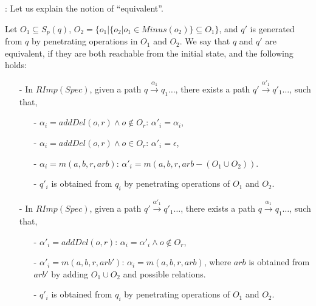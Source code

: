 : Let us explain the notion of ``equivalent''.

Let $O_1 \subseteq S_p(q)$, $O_2 = \{ o_1 \vert  \{ o_2 \vert o_1 \in Minus(o_2) \} \subseteq O_1 \}$, and $q'$ is generated from $q$ by penetrating operations in $O_1$ and $O_2$. We say that $q$ and $q'$ are equivalent, if they are both reachable from the initial state, and the following holds:

\begin{itemize}
\setlength{\itemsep}{0.5pt}
\item[-] In $RImp(Spec)$, given a path $q {\xrightarrow{\alpha_1}} q_1 \ldots$, there exists a path $q' {\xrightarrow{\alpha'_1}} q'_1 \ldots$, such that,

    \begin{itemize}
    \setlength{\itemsep}{0.5pt}
    \item[-] $\alpha_i = addDel(o,r) \wedge o \notin O_r$: $\alpha'_i = \alpha_i$,

    \item[-] $\alpha_i = addDel(o,r) \wedge o \in O_r$: $\alpha'_i = \epsilon$,

    \item[-] $\alpha_i = m(a,b,r,arb)$: $\alpha'_i = m(a,b,r,arb-(O_1 \cup O_2))$.

    \item[-] $q'_i$ is obtained from $q_i$ by penetrating operations of $O_1$ and $O_2$.
    \end{itemize}

\item[-] In $RImp(Spec)$, given a path $q' {\xrightarrow{\alpha'_1}} q'_1 \ldots$, there exists a path $q {\xrightarrow{\alpha_1}} q_1 \ldots$, such that,

    \begin{itemize}
    \setlength{\itemsep}{0.5pt}
    \item[-] $\alpha'_i = addDel(o,r)$: $\alpha_i = \alpha'_i \wedge o \notin O_r$,


    \item[-] $\alpha'_i = m(a,b,r,arb')$: $\alpha_i = m(a,b,r,arb)$, where $arb$ is obtained from $arb'$ by adding $O_1 \cup O_2$ and possible relations.

    \item[-] $q'_i$ is obtained from $q_i$ by penetrating operations of $O_1$ and $O_2$.
    \end{itemize}
\end{itemize}


